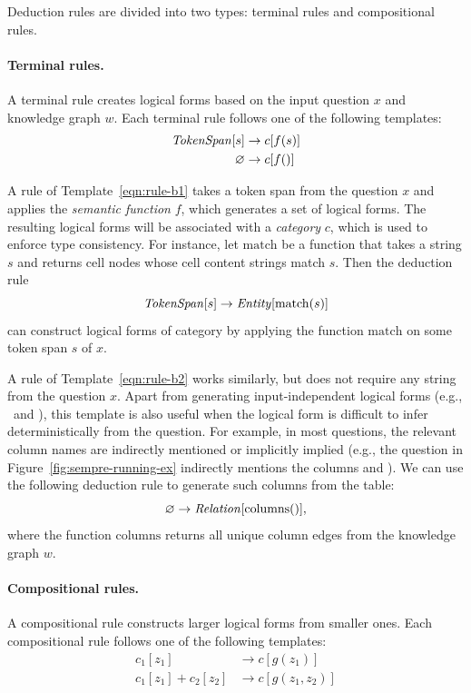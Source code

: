 Deduction rules are divided into two types: terminal rules
and compositional rules.

\paragraph{Terminal rules.}
A terminal rule creates logical forms based on the input
question $x$ and knowledge graph $w$.
Each terminal rule follows one of the following templates:
\begin{align}
\text{\emph{TokenSpan}}[s] &\to c[f(s)] \label{eqn:rule-b1} \\
\varnothing &\to c[f()] \label{eqn:rule-b2}
\end{align}

A rule of Template~\ref{eqn:rule-b1} takes
a token span from the question $x$
and applies the \emph{semantic function} $f$,
which generates a set of logical forms.
The resulting logical forms will be associated with
a \emph{category} $c$, which is used to enforce type consistency.
For instance, let $\mathrm{match}$ be a function
that takes a string $s$
and returns cell nodes whose cell content strings
match $s$.
Then the deduction rule
\begin{equation}
\text{\emph{TokenSpan}}[s] \to \text{\emph{Entity}}[\mathrm{match}(s)]
\end{equation}
can construct logical forms of category 
by applying the function $\mathrm{match}$
on some token span $s$ of $x$.

A rule of Template~\ref{eqn:rule-b2} works similarly,
but does not require any string from the question $x$.
Apart from generating input-independent logical forms
(e.g., \T{>=}\, and ),
this template is also useful when the logical form
is difficult to infer deterministically from the question.
For example, in most questions,
the relevant column names are indirectly mentioned
or implicitly implied
(e.g., the question \runningEx
in Figure~\ref{fig:sempre-running-ex}
indirectly mentions the columns  and ).
We can use the following deduction rule
to generate such columns from the table:
\begin{equation}
\varnothing \to \text{\emph{Relation}}[\mathrm{columns}()],
\end{equation}
where the function $\mathrm{columns}$ returns all unique column edges
from the knowledge graph $w$.

\paragraph{Compositional rules.}
A compositional rule constructs larger logical forms
from smaller ones.
Each compositional rule follows one of the following templates:
\begin{align}
c_1[z_1] &\to c[g(z_1)] \label{eqn:rule-c1} \\
c_1[z_1] + c_2[z_2] &\to c[g(z_1, z_2)] \label{eqn:rule-c2}
\end{align}

